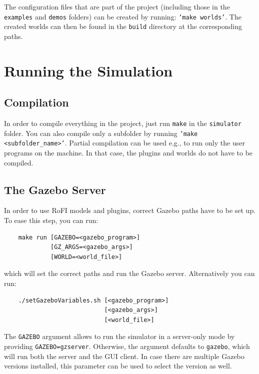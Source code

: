 \documentclass[
  printed, %
  color,   %
  notable, %
  oneside, %
  nolof,   %
  nolot,   %
  nocover,
]{fithesis3}
\newcommand{\code}[1]{\texttt{#1}}
\begin{document}
The configuration files that are part of the project (including those in the \code{examples} and \code{demos} folders) can be created by running: \code{'make worlds'}.
The created worlds can then be found in the \code{build} directory at the corresponding paths.

\section{Running the Simulation}

\subsection{Compilation}

In order to compile everything in the project, just run \code{make} in the \code{simulator} folder.
You can also compile only a subfolder by running \code{'make <subfolder\_name>'}.
Partial compilation can be used e.g., to run only the user programs on the machine.
In that case, the plugins and worlds do not have to be compiled.

\subsection{The Gazebo Server}

In order to use RoFI models and plugins, correct Gazebo paths have to be set up.
To ease this step, you can run:
\begin{center}
\begin{verbatim}
    make run [GAZEBO=<gazebo_program>]
             [GZ_ARGS=<gazebo_args>]
             [WORLD=<world_file>]
\end{verbatim}
\end{center}
which will set the correct paths and run the Gazebo server.
Alternatively you can run:
\begin{center}
\begin{verbatim}
    ./setGazeboVariables.sh [<gazebo_program>]
                            [<gazebo_args>]
                            [<world_file>]
\end{verbatim}
\end{center}

The \code{GAZEBO} argument allows to run the simulator in a server-only mode by providing \code{GAZEBO=gzserver}.
Otherwise, the argument defaults to \code{gazebo}, which will run both the server and the GUI client.
In case there are multiple Gazebo versions installed, this parameter can be used to select the version as well.
\end{document}
